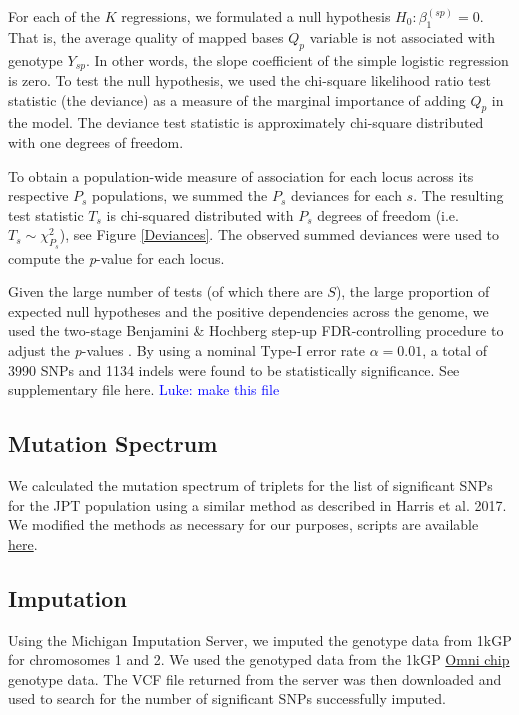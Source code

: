 \documentclass[9pt,lineno]{elife}
\newcommand{\luke}[1]{\textcolor{blue}{Luke: #1}}
\begin{document}
For each of the $K$ regressions, we formulated a null hypothesis $H_{0}: \beta_{1}^{(sp)}=0$. That is, the average quality of mapped bases $Q_{p}$ variable is not associated with genotype $Y_{sp}$.
In other words, the slope coefficient of the simple logistic regression is zero.
To test the null hypothesis, we used the chi-square likelihood ratio test statistic (the deviance) as a measure of the marginal importance of adding $Q_{p}$ in the model. 
The deviance test statistic is approximately chi-square distributed with one degrees of freedom.  

To obtain a population-wide measure of association for each locus across its respective $P_s$ populations, we summed the $P_s$ deviances for each $s$. The resulting test statistic $T_s$ is chi-squared distributed with $P_s$ degrees of freedom (i.e. $T_s \sim \chi^2_{P_s}$), see Figure \ref{Deviances}.
The observed summed deviances were used to compute the \textit{p}-value for each locus.


Given the large number of tests (of which there are $S$), the large proportion of expected null hypotheses and the positive dependencies across the genome, we used the two-stage Benjamini \& Hochberg step-up FDR-controlling procedure to adjust the \textit{p}-values \citep{Benjamini2006}.
By using a nominal Type-I error rate $\alpha = 0.01$, a total of 3990 SNPs and 1134 indels were found to be statistically significance. See supplementary file {here}. \luke{make this file}

\subsection{Mutation Spectrum}
We calculated the mutation spectrum of triplets for the list of significant SNPs for the JPT population using a similar method as described in Harris et al. 2017. \citep{Harris2017a}
We modified the methods as necessary for our purposes, scripts are available \href{https://github.com/LukeAndersonTrocme/QualityPaper}{here}. 

\subsection{Imputation}
Using the Michigan Imputation Server, we imputed the genotype data from 1kGP for chromosomes 1 and 2.
We used the genotyped data from the 1kGP \href{ftp://ftp.1000genomes.ebi.ac.uk/vol1/ftp/release/20130502/supporting/hd_genotype_chip/ALL.chip.omni_broad_sanger_combined.20140818.snps.genotypes.vcf.gz}{Omni chip} genotype data.
The VCF file returned from the server was then downloaded and used to search for the number of significant SNPs successfully imputed.
\end{document}
